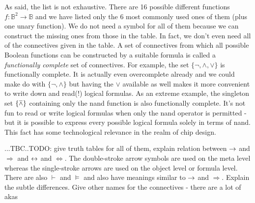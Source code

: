 As said, the list is not exhaustive. There are 16 possible different functions $f: \mathbb{B}^2 \rightarrow \mathbb{B}$ and we have listed only the $6$ most commonly used ones of them (plus one unary function). We do not need a symbol for all of them because we can construct the missing ones from those in the table. In fact, we don't even need all of the connectives given in the table. A set of connectives from which all possible Boolean functions can be constructed by a suitable formula is called a \emph{functionally complete} set of connectives. For example, the set $\{\neg, \wedge, \vee\}$ is functionally complete. It is actually even overcomplete already and we could make do with  $\{\neg, \wedge\}$ but having the $\vee$ available as well makes it more convenient to write down and read(!) logical formulas. As an extreme example, the singleton set $\{\mathbin{\barwedge}\}$ containing only the nand function is also functionally complete. It's not fun to read or write logical formulas when only the nand operator is permitted - but it is possible to express every possible logical formula solely in terms of nand. This fact has some technological relevance in the realm of chip design.

...TBC..TODO: give truth tables for all of them, explain relation between $\mathbin{\rightarrow}$ and $\Rightarrow$ and $\mathbin{\leftrightarrow}$ and $\Leftrightarrow$. The double-stroke arrow symbols are used on the meta level whereas the single-stroke arrows are used on the object level or formula level. There are also $\vdash$ and $\vDash$ and also have meanings similar to $\mathbin{\rightarrow}$ and $\Rightarrow$. Explain the subtle differences. Give other names for the connectives - there are a lot of akas




